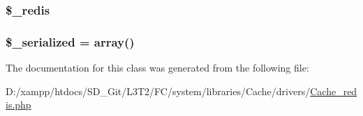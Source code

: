 \subsubsection[{\$\+\_\+redis}]{\setlength{\rightskip}{0pt plus 5cm}\$\+\_\+redis\hspace{0.3cm}{\ttfamily [protected]}}\label{class_c_i___cache__redis_a36de60a8fcbe3efac91a87577d0728de}
\hypertarget{class_c_i___cache__redis_a138ded30ad61d04611681cdf7060a6cf}{}
\subsubsection[{\$\+\_\+serialized}]{\setlength{\rightskip}{0pt plus 5cm}\$\+\_\+serialized = array()\hspace{0.3cm}{\ttfamily [protected]}}\label{class_c_i___cache__redis_a138ded30ad61d04611681cdf7060a6cf}


The documentation for this class was generated from the following file\+:\begin{DoxyCompactItemize}
\item 
D\+:/xampp/htdocs/\+S\+D\+\_\+\+Git/\+L3\+T2/\+F\+C/system/libraries/\+Cache/drivers/\hyperlink{_cache__redis_8php}{Cache\+\_\+redis.\+php}\end{DoxyCompactItemize}
